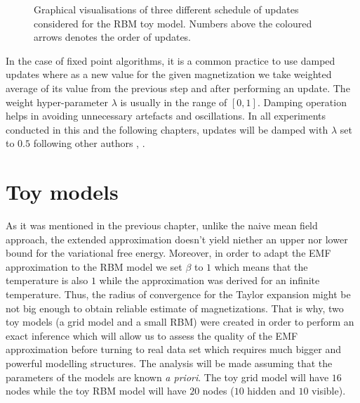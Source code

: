 \begin{figure}[!htb]
\begin{center}
\end{center}
\endminipage\hfill
 \caption[1]{Graphical visualisations of three different schedule of updates considered for the RBM toy model. Numbers above the coloured arrows denotes the order of updates.}
\label{fig:updates}
\end{figure}
\newpage

In the case of fixed point algorithms, it is a common practice to use damped updates \cite{murphy2012machine} where as a new value for the given magnetization we take weighted average of its value from the previous step and after performing an update. The weight hyper-parameter $\lambda$ is usually in the range of $[0,1]$. Damping operation helps in avoiding unnecessary artefacts and oscillations. In all experiments conducted in this and the following chapters, updates will be damped with $\lambda$ set to $0.5$ following other authors \cite{gabrie2015training}, \cite{welling2002new}.

\section{Toy models}
As it was mentioned in the previous chapter, unlike the naive mean field approach, the extended approximation doesn't yield niether an upper nor lower bound for the variational free energy. Moreover, in order to adapt the EMF approximation to the RBM model we set $\beta$ to $1$ which means that the temperature is also $1$ while the approximation was derived for an infinite temperature. Thus, the radius of convergence for the Taylor expansion might be not big enough to obtain reliable estimate of magnetizations. That is why, two toy models (a grid model and a small RBM) were created in order to perform an exact inference which will allow us to assess the quality of the EMF approximation before turning to real data set which requires much bigger and powerful modelling structures. The analysis will be made assuming that the parameters of the models are known \emph{a priori}. The toy grid model will have $16$ nodes while the toy RBM model will have $20$ nodes ($10$ hidden and $10$ visible).

